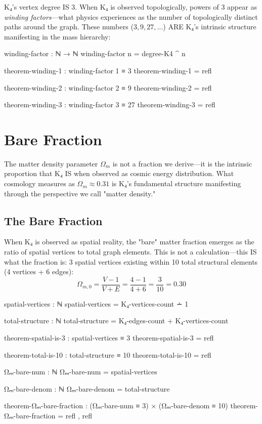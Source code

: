 \documentclass[11pt,a4paper]{book}
\begin{document}
K₄'s vertex degree IS 3. When K₄ is observed topologically, powers of 3 appear as 
\emph{winding factors}—what physics experiences as the number of topologically distinct 
paths around the graph. These numbers ($3, 9, 27, \ldots$) ARE K₄'s intrinsic structure 
manifesting in the mass hierarchy:

\begin{code}
winding-factor : ℕ → ℕ
winding-factor n = degree-K4 ^ n

theorem-winding-1 : winding-factor 1 ≡ 3
theorem-winding-1 = refl

theorem-winding-2 : winding-factor 2 ≡ 9
theorem-winding-2 = refl

theorem-winding-3 : winding-factor 3 ≡ 27
theorem-winding-3 = refl
\end{code}


\chapter{Bare Fraction}
\label{chap:matter-density-parameter}

The matter density parameter $\Omega_m$ is not a fraction we derive—it is the intrinsic proportion that K₄ IS when observed as cosmic energy distribution. What cosmology measures as $\Omega_m \approx 0.31$ is K₄'s fundamental structure manifesting through the perspective we call "matter density."

\section{The Bare Fraction}

When K₄ is observed as spatial reality, the "bare" matter fraction emerges as the ratio of spatial vertices to total graph elements. This is not a calculation—this IS what the fraction is: 3 spatial vertices existing within 10 total structural elements (4 vertices + 6 edges):
\[
\Omega_{m,0} = \frac{V - 1}{V + E} = \frac{4 - 1}{4 + 6} = \frac{3}{10} = 0.30
\]

\begin{code}
spatial-vertices : ℕ
spatial-vertices = K₄-vertices-count ∸ 1

total-structure : ℕ
total-structure = K₄-edges-count + K₄-vertices-count

theorem-spatial-is-3 : spatial-vertices ≡ 3
theorem-spatial-is-3 = refl

theorem-total-is-10 : total-structure ≡ 10
theorem-total-is-10 = refl

Ωₘ-bare-num : ℕ
Ωₘ-bare-num = spatial-vertices

Ωₘ-bare-denom : ℕ
Ωₘ-bare-denom = total-structure

theorem-Ωₘ-bare-fraction : (Ωₘ-bare-num ≡ 3) × (Ωₘ-bare-denom ≡ 10)
theorem-Ωₘ-bare-fraction = refl , refl
\end{code}
\end{document}
